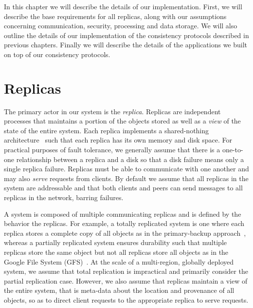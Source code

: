 In this chapter we will describe the details of our implementation.
First, we will describe the base requirements for all replicas, along with our assumptions concerning communication, security, processing and data storage.
We will also outline the details of our implementation of the consistency protocols described in previous chapters.
Finally we will describe the details of the applications we built on top of our consistency protocols.

\section{Replicas}
\label{ch05_replicas}

The primary actor in our system is the \emph{replica}.
Replicas are independent processes that maintains a portion of the objects stored as well as a \emph{view} of the state of the entire system.
Each replica implements a shared-nothing architecture~\cite{shared_nothing} such that each replica has its own memory and disk space.
For practical purposes of fault tolerance, we generally assume that there is a one-to-one relationship between a replica and a disk so that a disk failure means only a single replica failure.
Replicas must be able to communicate with one another and may also \emph{serve} requests from clients.
By default we assume that all replicas in the system are addressable and that both clients and peers can send messages to all replicas in the network, barring failures.

A system is composed of multiple communicating replicas and is defined by the behavior the replicas.
For example, a totally replicated system is one where each replica stores a complete copy of all objects as in the primary-backup approach~\cite{primary_backup}, whereas a partially replicated system ensures durability such that multiple replicas store the same object but not all replicas store all objects as in the Google File System (GFS)~\cite{gfs}.
At the scale of a multi-region, globally deployed system, we assume that total replication is impractical and primarily consider the partial replication case.
However, we also assume that replicas maintain a view of the entire system, that is meta-data about the location and provenance of all objects, so as to direct client requests to the appropriate replica to serve requests.

